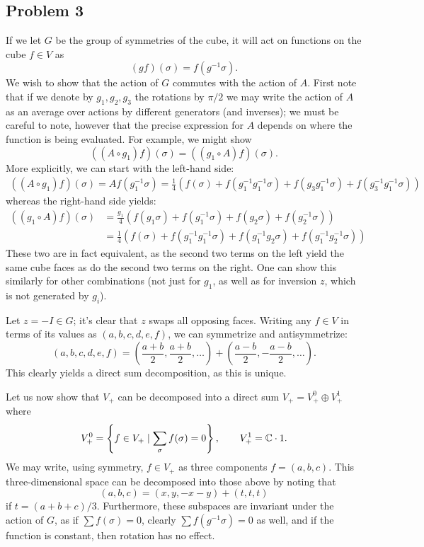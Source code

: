 \documentclass{../../mathnotes}
\begin{document}
\subsection*{Problem 3}

If we let $G$ be the group of symmetries of the cube, it will act on functions on the cube $f\in V$ as
\[(gf)(\sigma)=f(g^{-1}\sigma).\]
We wish to show that the action of $G$ commutes with the action of $A$. First note that if we denote by $g_1,g_2,g_3$ the rotations
by $\pi/2$ we may write the action of $A$ as an average over actions by different generators (and inverses); we must be careful to note,
however that the precise expression for $A$ depends on where the function is being evaluated. For example, we might show
\[((A\circ g_1)f)(\sigma)=((g_1\circ A)f)(\sigma).\]
More explicitly, we can start with the left-hand side:
\begin{align*}
    ((A\circ g_1)f)(\sigma)=Af(g_1^{-1}\sigma)=\frac{1}{4}\left( f(\sigma)+f(g^{-1}_1g^{-1}_1\sigma)+f(g_3g_1^{-1}\sigma)+f(g_3^{-1}g_1^{-1}\sigma) \right)
\end{align*}
whereas the right-hand side yields:
\begin{align*}
    ( (g_1\circ A)f)(\sigma)&=\frac{g_1}{4}\left( f(g_1\sigma)+f(g_1^{-1}\sigma)+f(g_2\sigma)+f(g_2^{-1}\sigma) \right)\\
    &=\frac{1}{4}\left(f(\sigma)+f(g_1^{-1}g_1^{-1}\sigma)+f(g_1^{-1}g_2\sigma)+f(g_1^{-1}g_2^{-1}\sigma)\right)
\end{align*}
These two are in fact equivalent, as the second two terms on the left yield the same cube faces as do the second two terms on the right.
One can show this similarly for other combinations (not just for $g_1$, as well as for inversion $z$, which is not generated by $g_i$).

Let $z=-I\in G$; it's clear that $z$ swaps all opposing faces. Writing any $f\in V$ in terms of its values as $(a,b,c,d,e,f)$, we can symmetrize
and antisymmetrize:
\[(a,b,c,d,e,f)=\left(\frac{a+b}{2},\frac{a+b}{2},\ldots \right)+\left(\frac{a-b}{2},-\frac{a-b}{2},\ldots\right).\]
This clearly yields a direct sum decomposition, as this is unique.

Let us now show that $V_+$ can be decomposed into a direct sum $V_+=V_+^0\oplus V_+^1$ where
\[V_+^0=\left\{ f\in V_+\mid \sum_\sigma f(\sigma)=0 \right\}, \qquad V_+^1=\mathbb{C}\cdot 1.\]
We may write, using symmetry, $f\in V_+$ as three components $f=(a,b,c)$. This three-dimensional space can be decomposed into those above by noting that
\[(a,b,c)=(x,y,-x-y)+(t,t,t)\]
if $t=(a+b+c)/3$. Furthermore, these subspaces are invariant under the action of $G$, as if $\sum f(\sigma)=0$, clearly $\sum f(g^{-1}\sigma)=0$ as well, and
if the function is constant, then rotation has no effect.
\end{document}
